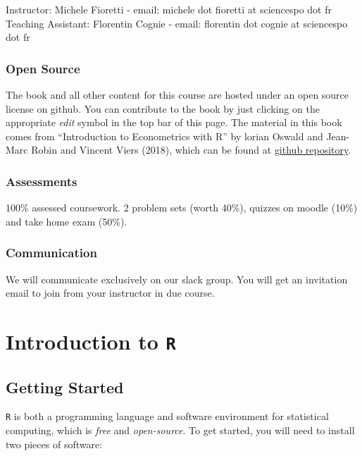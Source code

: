 \documentclass[]{book}
\begin{document}
Instructor: Michele Fioretti - email: michele dot fioretti at sciencespo dot fr
Teaching Assistant: Florentin Cognie - email: florentin dot cognie at sciencespo dot fr

\hypertarget{open-source}{%
\subsection*{Open Source}\label{open-source}}

The book and all other content for this course are hosted under an open source license on github. You can contribute to the book by just clicking on the appropriate \emph{edit} symbol in the top bar of this page. The material in this book comes from ``Introduction to Econometrics with R'' by lorian Oswald and Jean-Marc Robin and Vincent Viers (2018), which can be found at \href{https://github.com/ScPoEcon/ScPoEconometrics}{github repository}.

\hypertarget{assessments}{%
\subsection*{Assessments}\label{assessments}}

100\% assessed coursework. 2 problem sets (worth 40\%), quizzes on moodle (10\%) and take home exam (50\%).

\hypertarget{communication}{%
\subsection*{Communication}\label{communication}}

We will communicate exclusively on our slack group. You will get an invitation email to join from your instructor in due course.

\hypertarget{R-intro}{%
\chapter{\texorpdfstring{Introduction to \texttt{R}}{Introduction to R}}\label{R-intro}}

\hypertarget{getting-started}{%
\section{Getting Started}\label{getting-started}}

\texttt{R} is both a programming language and software environment for statistical computing, which is \emph{free} and \emph{open-source}. To get started, you will need to install two pieces of software:
\end{document}
